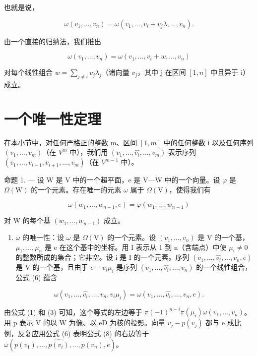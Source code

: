 也就是说，

\[
\omega (v _ {1}, \dots , v _ {n}) = \omega (v _ {1}, \dots , v _ {i} + v _ {j} \lambda , \dots , v _ {n}).\tag{5}
\]

由一个直接的归纳法，我们推出

\[
\omega (v _ {1}, \ldots , v _ {n}) = \omega (v _ {1}, \ldots , v _ {i} + w, \ldots , v _ {n})\tag{6}
\]

对每个线性组合 \(w = \sum_{j \neq i} v_j \lambda_j\)（诸向量 \(v_j\)，其中 j 在区间 \([1, n]\) 中且异于 i）成立。

\section{一个唯一性定理}

在本小节中，对任何严格正的整数 m、区间 \([1,m]\) 中的任何整数 i 以及任何序列 \((v_{1},\ldots,v_{m})\)（在 \(V^{m}\) 中），我们用 \((v_{1},\ldots,\widehat{v_{i}},\ldots,v_{m})\) 表示序列 \((v_{1},\ldots,v_{i-1},v_{i+1},\ldots,v_{m})\)（在 \(V^{m-1}\) 中）。

命题 1. --- 设 W 是 V 中的一个超平面，e 是 V---W 中的一个向量。设 \(\varphi\) 是 \(\Omega(\mathrm{W})\) 的一个元素。存在唯一的元素 \(\omega\) 属于 \(\Omega(\mathrm{V})\)，使得我们有

\[
\omega (w _ {1}, \ldots , w _ {n - 1}, e) = \varphi (w _ {1}, \ldots , w _ {n - 1})\tag{7}
\]

对 W 的每个基 \((w_{1},\ldots ,w_{n - 1})\) 成立。

\begin{enumerate}
\def\labelenumi{\Alph{enumi})}
\tightlist
\item
  \(\omega\) 的唯一性：设 \(\omega\) 是 \(\Omega(\mathrm{V})\) 的一个元素。设 \((v_{1},\ldots,v_{n})\) 是 V 的一个基，\(\mu_{1},\ldots,\mu_{n}\) 是 e 在这个基中的坐标。用 I 表示从 1 到 n（含端点）中使 \(\mu_{i}\neq0\) 的整数所成的集合；它非空。设 i 是 I 的一个元素。序列 \((v_{1},\ldots,\widehat{v_{i}},\ldots,v_{n},e)\) 是 V 的一个基，且由于 \(e-v_{i}\mu_{i}\) 是序列 \((v_{1},\ldots,\widehat{v_{i}},\ldots,v_{n})\) 的一个线性组合，公式 (6) 蕴含
\end{enumerate}

\[
\omega (v _ {1}, \ldots , \widehat {v _ {i}}, \ldots , v _ {n}, v _ {i} \mu_ {i}) = \omega (v _ {1}, \ldots , \widehat {v _ {i}}, \ldots , v _ {n}, e).\tag{8}
\]

由公式 (1) 和 (3) 可知，这个等式的左边等于 \(\pi(-1)^{n-i}\pi(\mu_i)\omega(v_1,\ldots,v_n)\)。用 p 表示 V 的以 W 为像、以 eD 为核的投影。向量 \(v_j - p(v_j)\) 都与 e 成比例，反复应用公式 (6) 表明公式 (8) 的右边等于 \(\omega(p(v_1),\ldots,\widehat{p(v_i)},\ldots,p(v_n),e)\)。

